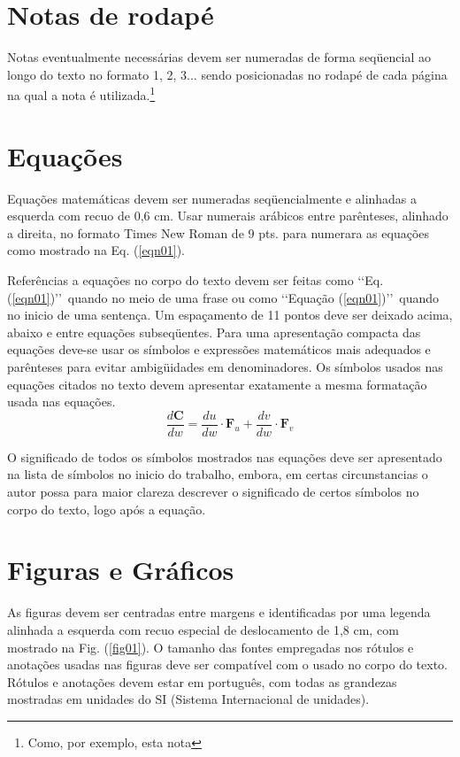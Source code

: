 \section{Notas de rodapé}

Notas eventualmente necessárias devem ser numeradas de forma seqüencial ao 
longo do texto no formato 1, 2, 3... sendo posicionadas no rodapé de cada 
página na qual a nota é utilizada.\footnote{Como, por exemplo, esta nota}

\section{Equações}

Equações matemáticas devem ser numeradas seqüencialmente e alinhadas a 
esquerda com recuo de 0,6 cm. Usar numerais arábicos entre parênteses, 
alinhado a direita, no formato Times New Roman de 9 pts. para numerara as 
equações como mostrado na Eq. (\ref{eqn01}).

Referências a equações no corpo do texto devem ser feitas como \lq\lq Eq. 
(\ref{eqn01})\rq\rq\ quando no meio de uma frase ou como \lq\lq Equação 
(\ref{eqn01})\rq\rq\ quando no inicio de uma sentença. Um espaçamento de 11 
pontos deve ser deixado acima, abaixo e entre equações subseqüentes. Para uma 
apresentação compacta das equações deve-se usar os símbolos e expressões 
matemáticos mais adequados e parênteses para evitar ambigüidades em 
denominadores. Os símbolos usados nas equações citados no texto devem 
apresentar exatamente a mesma formatação usada nas equações.
\begin{equation}
\label{eqn01}
	\frac{d\mathbf{C}}{dw} = \frac{du}{dw}\cdot \mathbf{F}_u + 
		\frac{dv}{dw}\cdot \mathbf{F}_v 
\end{equation}

O significado de todos os símbolos mostrados nas equações deve ser apresentado 
na lista de símbolos no inicio do trabalho, embora, em certas circunstancias o 
autor possa para maior clareza descrever o significado de certos símbolos no 
corpo do texto, logo após a equação.

\section{Figuras e Gráficos}

As figuras devem ser centradas entre margens e identificadas por uma legenda 
alinhada a esquerda com recuo especial de deslocamento de 1,8 cm, com mostrado 
na Fig. (\ref{fig01}). O tamanho das fontes empregadas nos rótulos e anotações 
usadas nas figuras deve ser compatível com o usado no corpo do texto. Rótulos e 
anotações devem estar em português, com todas as grandezas mostradas em 
unidades do SI (Sistema Internacional de unidades).

